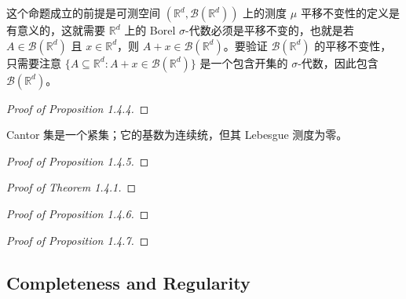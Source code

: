 \documentclass[11pt]{article}
\newcommand{\RR}{\mathbb{R}}
\newcommand{\calB}{\mathcal{B}}
\newcommand{\stubsubsection}[2][]{\subsection{#2}\if\relax\detokenize{#1}\relax\else\label{#1}\fi\mbox{}\par}
\begin{document}
这个命题成立的前提是可测空间 $(\RR^d,\calB(\RR^d))$ 上的测度 $\mu$ 平移不变性的定义是有意义的，这就需要 $\RR^d$ 上的 Borel $\sigma$-代数必须是平移不变的，也就是若 $A \in \calB(\RR^d)$ 且 $x \in \RR^d$，则 $A+x \in \calB(\RR^d)$。要验证 $\calB(\RR^d)$ 的平移不变性，只需要注意 $\{A \subseteq \RR^d : A+x \in \calB(\RR^d)\}$ 是一个包含开集的 $\sigma$-代数，因此包含 $\calB(\RR^d)$。

\begin{proof}[Proof of Proposition 1.4.4]
\end{proof}

\begin{example}\label{Example-1-4-1}
\end{example}

\begin{proposition}\label{Proposition-1-4-5}
    Cantor 集是一个紧集；它的基数为连续统，但其 Lebesgue 测度为零。
\end{proposition}

\begin{proof}[Proof of Proposition 1.4.5]
\end{proof}

\begin{example}\label{Example-1-4-2}
\end{example}

\begin{theorem}\label{Theorem-1-4-1}
\end{theorem}

\begin{proof}[Proof of Theorem 1.4.1]
\end{proof}

\begin{proposition}\label{Proposition-1-4-6}
\end{proposition}

\begin{proof}[Proof of Proposition 1.4.6]
\end{proof}

\begin{proposition}\label{Proposition-1-4-7}
\end{proposition}

\begin{proof}[Proof of Proposition 1.4.7]
\end{proof}

\clearpage

\stubsubsection[Section-1-5]{Completeness and Regularity}
\end{document}
